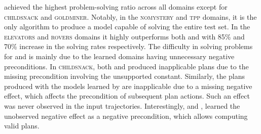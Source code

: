 \offlam{} achieved the highest problem-solving ratio across all domains except for \textsc{childsnack} and \textsc{goldminer}. Notably, in the \textsc{nomystery} and \textsc{tpp} domains, it is the only algorithm to produce a model capable of solving the entire test set.
In the \textsc{elevators} and \textsc{rovers} domains it highly outperforms both \samshort{} and \nolam{} with 85\% and 70\% increase in the 
solving rates respectively.
The difficulty in solving problems for \samshort{} and \nolam{} is mainly due to the learned domains having unnecessary negative preconditions. 
In \textsc{childsnack}, both \offlam{} and \nolam{} produced inapplicable plans due to the missing precondition involving the unsupported constant.
Similarly, the plans produced with the models learned by \offlam{} are inapplicable due to a missing negative effect, which affects the precondition of subsequent plan actions.
Such an effect was never observed in the input trajectories. Interestingly, \sam and \nolam, learned the unobserved negative effect as a negative precondition, which allows computing valid plans.






